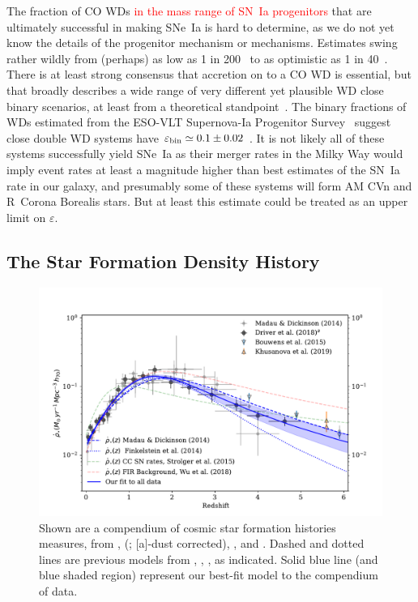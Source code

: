 \documentclass[apj, linenumbers]{aastex62}
\begin{document}
The fraction of CO WDs \textcolor{red}{in the mass range of SN~Ia progenitors} that are ultimately successful in making SNe~Ia is hard to determine, as we do not yet know the details of the progenitor mechanism or mechanisms. Estimates swing rather wildly from (perhaps) as low as 1 in 200~\citep{Breedt:2017rp} to as optimistic as 1 in 40~\citep{Maoz:2012}. There is at least strong consensus that accretion on to a CO WD is essential, but that broadly describes a wide range of very different yet plausible WD close binary scenarios, at least from a theoretical standpoint~\citep{Nelemans:2001hb,Nelemans:2001cs}. The binary fractions of WDs estimated from the ESO-VLT Supernova-Ia Progenitor Survey~\citep[SPY;][]{Napiwotzki:2007,Napiwotzki:2019ez} suggest close double WD systems have $\varepsilon_{\rm bin}\simeq0.1\pm0.02$ \citep{Maoz:2017zl}. It is not likely all of these systems successfully yield SNe~Ia as their merger rates in the Milky Way would imply event rates at least a magnitude higher than best estimates of the SN~Ia rate in our galaxy, and presumably some of these systems will form AM CVn and R~Corona Borealis stars. But at least this estimate could be treated as an upper limit on $\varepsilon$.

\subsection{The Star Formation Density History}\label{sec:csfh}
\begin{figure}[t]
   \centering
   \includegraphics[width=6.1in]{figure_csfh_today.pdf}
   \caption{\footnotesize Shown are a compendium of cosmic star formation histories measures, from \cite{Madau:2014fk}, \citeauthor{Driver:2018nr} (\citeyear{Driver:2018nr}; [a]-dust corrected), \cite{Bouwens:2015qy}, and \cite{Khusanova:2019kx}. Dashed and dotted lines are previous models from \cite{Madau:2014fk}, \cite{Finkelstein:2014fj}, \cite{Strolger:2015aa}, as indicated. Solid blue line (and blue shaded region) represent our best-fit model to the compendium of data.}
   \label{fig:csfhs}
\end{figure}
\end{document}
